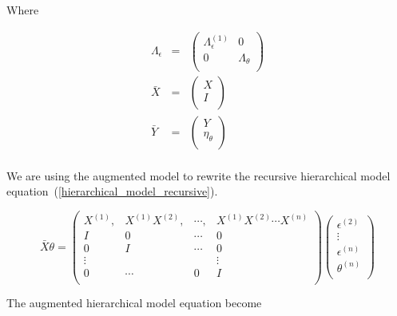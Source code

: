 \documentclass[final, paper=letter,5p,times,twocolumn]{elsarticle}
\theoremstyle{definition}
\begin{document}
Where

\begin{equation*}
  \left .
  \begin{array}{rcl}
    \Lambda_{\epsilon} & = & \left(
    \begin{array}{cc}
      \Lambda_{\epsilon}^{(1)} & 0 \\
      0 & \Lambda_{\theta} \\ 
    \end{array}
    \right) \\
   \bar{X} & = & \left(
    \begin{array}{c}
      X \\
      I \\ 
    \end{array}
    \right) \\
   \bar{Y} & = & \left(
    \begin{array}{cc}
      Y \\
      \eta_{\theta} \\ 
    \end{array}
    \right) \\
  \end{array}
  \right .
\end{equation*}

We are using the augmented model to rewrite the recursive hierarchical model equation~(\ref{hierarchical_model_recursive}).

\begin{equation*}
  \bar{X}\theta = 
  \left (
  \begin{array}{cccc}
    X^{(1)}, & X^{(1)}X^{(2)}, & \cdots, &    X^{(1)}X^{(2)} \cdots X^{(n)}  \\
    I & 0 & \cdots & 0 \\
    0 & I & \cdots & 0 \\
    \vdots &&& \vdots\\
    0 & \cdots & 0 & I\\
  \end{array}
  \right )
  \left (
  \begin{array}{c}
    \epsilon^{(2)}  \\
    \vdots \\
    \epsilon^{(n)}  \\
    \theta^{(n)}  \\
  \end{array}
  \right )
\end{equation*}

The augmented hierarchical model equation become
\end{document}
